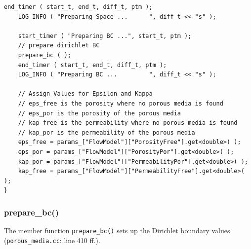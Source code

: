 \documentclass{article}
\begin{document}
\begin{lstlisting}[firstnumber=280]
    end_timer ( start_t, end_t, diff_t, ptm );
    LOG_INFO ( "Preparing Space ...      ", diff_t << "s" );

    start_timer ( "Preparing BC ...", start_t, ptm );
    // prepare dirichlet BC
    prepare_bc ( );
    end_timer ( start_t, end_t, diff_t, ptm );
    LOG_INFO ( "Preparing BC ...         ", diff_t << "s" );

    // Assign Values for Epsilon and Kappa
    // eps_free is the porosity where no porous media is found
    // eps_por is the porosity of the porous media
    // kap_free is the permeability where no porous media is found
    // kap_por is the permeability of the porous media
    eps_free = params_["FlowModel"]["PorosityFree"].get<double>( );
    eps_por = params_["FlowModel"]["PorosityPor"].get<double>( );
    kap_por = params_["FlowModel"]["PermeabilityPor"].get<double>( );
    kap_free = params_["FlowModel"]["PermeabilityFree"].get<double>( );
}
\end{lstlisting}

\subsubsection{prepare\_bc()}
\label{sec:prepare_bc}

The member function \texttt{prepare\_bc()} sets up the Dirichlet boundary values \newline(\texttt{porous\_media.cc}: line 410 ff.).
\end{document}
